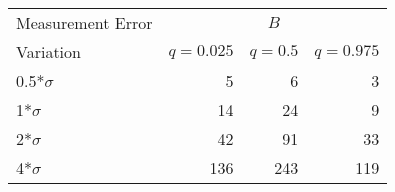 
\begin{tabular}{lrrr}
\toprule
\multicolumn{1}{c}{Measurement Error} & \multicolumn{3}{c}{$B$} \\
Variation & $q = 0.025$ & $q = 0.5$ & $q = 0.975$\\
\midrule
0.5*$\sigma$ & 5 & 6 & 3\\
1*$\sigma$ & 14 & 24 & 9\\
2*$\sigma$ & 42 & 91 & 33\\
4*$\sigma$ & 136 & 243 & 119 \\
\bottomrule
\end{tabular}
